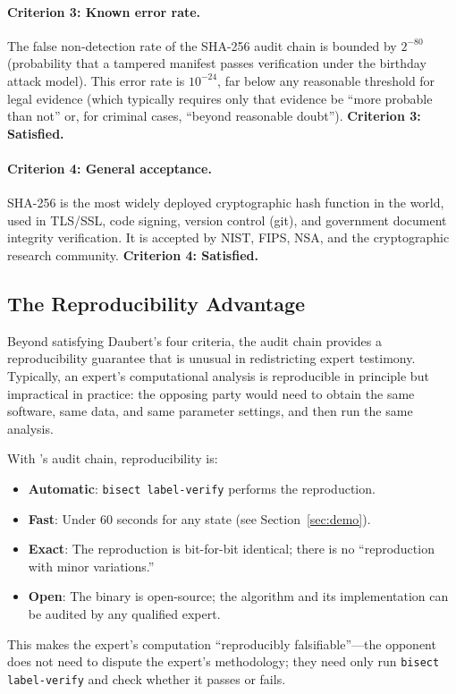 \paragraph{Criterion 3: Known error rate.}
The false non-detection rate of the SHA-256 audit chain is bounded by
$2^{-80}$ (probability that a tampered manifest passes verification under
the birthday attack model).
This error rate is $10^{-24}$, far below any reasonable threshold for
legal evidence (which typically requires only that evidence be ``more
probable than not'' or, for criminal cases, ``beyond reasonable doubt'').
\textbf{Criterion 3: Satisfied.}

\paragraph{Criterion 4: General acceptance.}
SHA-256 is the most widely deployed cryptographic hash function in the world,
used in TLS/SSL, code signing, version control (git), and government
document integrity verification.
It is accepted by NIST, FIPS, NSA, and the cryptographic research community.
\textbf{Criterion 4: Satisfied.}

\subsection{The Reproducibility Advantage}

Beyond satisfying Daubert's four criteria, the audit chain provides a
reproducibility guarantee that is unusual in redistricting expert testimony.
Typically, an expert's computational analysis is reproducible in principle
but impractical in practice: the opposing party would need to obtain the
same software, same data, and same parameter settings, and then run the same
analysis.

With \bisect{}'s audit chain, reproducibility is:
\begin{itemize}
\item \textbf{Automatic}: \texttt{bisect label-verify} performs the reproduction.
\item \textbf{Fast}: Under 60 seconds for any state (see Section~\ref{sec:demo}).
\item \textbf{Exact}: The reproduction is bit-for-bit identical; there is no
  ``reproduction with minor variations.''
\item \textbf{Open}: The \bisect{} binary is open-source; the algorithm and
  its implementation can be audited by any qualified expert.
\end{itemize}

This makes the expert's computation ``reproducibly falsifiable''---the
opponent does not need to dispute the expert's methodology; they need only
run \texttt{bisect label-verify} and check whether it passes or fails.
